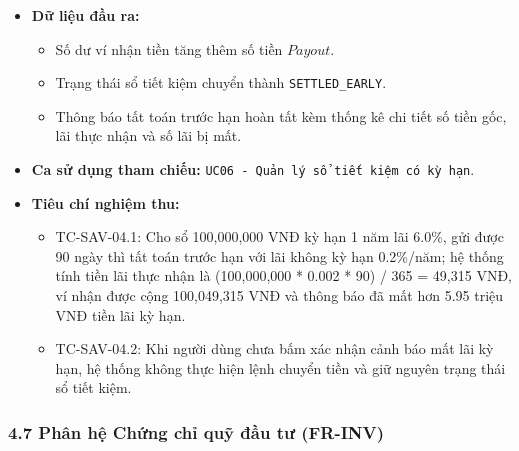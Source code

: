 \documentclass[11pt,a4paper]{article}
\providecommand{\tightlist}{
  \setlength{\itemsep}{0pt}\setlength{\parskip}{0pt}}
\begin{document}
\begin{itemize}
\begin{itemize}
    \begin{itemize}
    \tightlist
    \item
      Tính tổng số tiền thực nhận:
      \(Payout = Principal + ActualInterest\).
    \item
      Cộng \(Payout\) vào số dư của ví nhận tiền theo
      \texttt{BR-FIN-02}.
    \item
      Cập nhật trạng thái sổ tiết kiệm sang \texttt{SETTLED\_EARLY} (tất
      toán trước hạn), lưu lại thông tin số lãi đã mất.
    \item
      Cập nhật ngắt liên kết tài sản khỏi quỹ mục tiêu theo
      \texttt{BR-FIN-08}.
    \end{itemize}
  \end{itemize}
\item
  \textbf{Dữ liệu đầu ra:}

  \begin{itemize}
  \tightlist
  \item
    Số dư ví nhận tiền tăng thêm số tiền \(Payout\).
  \item
    Trạng thái sổ tiết kiệm chuyển thành \texttt{SETTLED\_EARLY}.
  \item
    Thông báo tất toán trước hạn hoàn tất kèm thống kê chi tiết số tiền
    gốc, lãi thực nhận và số lãi bị mất.
  \end{itemize}
\item
  \textbf{Ca sử dụng tham chiếu:}
  \texttt{UC06\ -\ Quản\ lý\ sổ\ tiết\ kiệm\ có\ kỳ\ hạn}.
\item
  \textbf{Tiêu chí nghiệm thu:}

  \begin{itemize}
  \tightlist
  \item
    TC-SAV-04.1: Cho sổ 100,000,000 VNĐ kỳ hạn 1 năm lãi 6.0\%, gửi được
    90 ngày thì tất toán trước hạn với lãi không kỳ hạn 0.2\%/năm; hệ
    thống tính tiền lãi thực nhận là (100,000,000 * 0.002 * 90) / 365 =
    49,315 VNĐ, ví nhận được cộng 100,049,315 VNĐ và thông báo đã mất
    hơn 5.95 triệu VNĐ tiền lãi kỳ hạn.
  \item
    TC-SAV-04.2: Khi người dùng chưa bấm xác nhận cảnh báo mất lãi kỳ
    hạn, hệ thống không thực hiện lệnh chuyển tiền và giữ nguyên trạng
    thái sổ tiết kiệm.
  \end{itemize}
\end{itemize}

\newpage

\subsubsection{4.7 Phân hệ Chứng chỉ quỹ đầu tư
(FR-INV)}\label{47-phuxe2n-hux1ec7-chux1ee9ng-chux1ec9-quux1ef9-ux111ux1ea7u-tux1b0-fr-inv}
\end{document}
